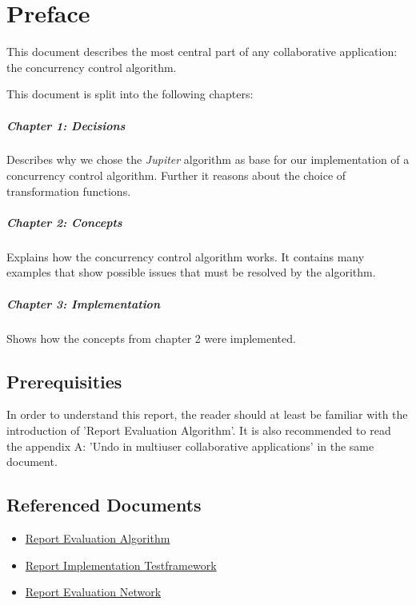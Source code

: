 \chapter*{Preface}
This document describes the most central part of any collaborative application: the concurrency control algorithm.

This document is split into the following chapters:

\paragraph{Chapter 1: Decisions} Describes why we chose the \emph{Jupiter} algorithm as base for our implementation of a concurrency control algorithm. Further it reasons about the choice of transformation functions.

\paragraph{Chapter 2: Concepts} Explains how the concurrency control algorithm works. It contains many examples that show possible issues that must be resolved by the algorithm.

\paragraph{Chapter 3: Implementation} Shows how the concepts from chapter 2 were implemented.

\section*{Prerequisities}
In order to understand this report, the reader should at least be familiar with the introduction of 'Report Evaluation Algorithm'. It is also recommended to read the appendix A: 'Undo in multiuser collaborative applications' in the same document.

\section*{Referenced Documents}
\begin{itemize}
 \item \href{http://ace.iserver.ch:81/repos/ace/ace/trunk/docs/pdf/algorithm.pdf}{Report Evaluation Algorithm}
 \item \href{http://ace.iserver.ch:81/repos/ace/ace/trunk/docs/pdf/testframework.pdf}{Report Implementation Testframework}
 \item \href{http://ace.iserver.ch:81/repos/ace/ace/trunk/docs/pdf/network.pdf}{Report Evaluation Network}
\end{itemize}
